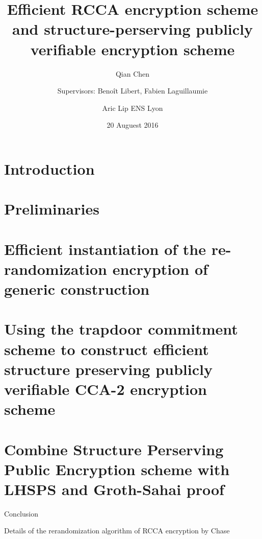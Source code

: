 \documentclass[11pt]{article}
\begin{document}
\title{Efficient RCCA encryption scheme and structure-perserving publicly verifiable encryption scheme}

\author{Qian Chen \and Supervisors: Beno\^it Libert, Fabien Laguillaumie \and Aric Lip ENS Lyon}

\date{20 Auguest 2016}

\maketitle

\thispagestyle{empty}



\section{Introduction}


\newpage

\section{Preliminaries}



\section{Efficient instantiation of the re-randomization encryption of generic construction~\cite{DBLP:conf/eurocrypt/ChaseKLM12}}


\section{Using the trapdoor commitment scheme to construct efficient structure preserving publicly verifiable CCA-2 encryption scheme}


\section{Combine Structure Perserving Public Encryption scheme with LHSPS and Groth-Sahai proof}


\begin{section}{Conclusion}
  
\end{section}

\newpage

\printbibliography

\begin{appendices}
  
\begin{section}{Details of the rerandomization algorithm of RCCA encryption by Chase \etal\cite{DBLP:conf/eurocrypt/ChaseKLM12}}
  \label{Rerandomization}
  
\end{section}


\end{appendices}
\end{document}
